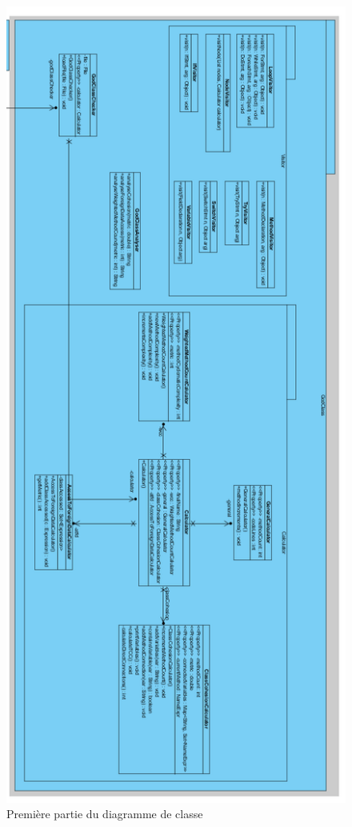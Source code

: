 \documentclass[a4paper, 11pt]{article}
\begin{document}
	\begin{figure}[!h]
		\centering
		\includegraphics[scale=0.8]{Images/ClassDiagram1.png}
		\caption{Première partie du diagramme de classe}
		\label{diag1}
	\end{figure}
	
\end{document}
